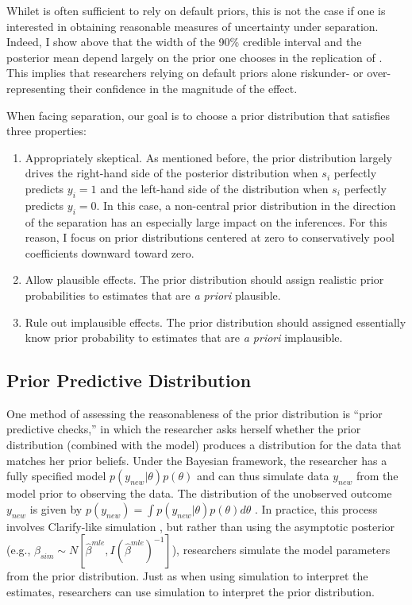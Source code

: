 \documentclass[12pt]{article}
\begin{document}
Whilet is often sufficient to rely on default priors, this is not the case if one is interested in obtaining reasonable measures of uncertainty under separation. Indeed, I show above that the width of the 90\% credible interval and the posterior mean depend largely on the prior one chooses in the replication of \cite{BarrilleauxRainey2014}. This implies that researchers relying on default priors alone riskunder- or over-representing their confidence in the magnitude of the effect.

When facing separation, our goal is to choose a prior distribution that satisfies three properties:
\begin{enumerate}
\item Appropriately skeptical. As mentioned before, the prior distribution largely drives the right-hand side of the posterior distribution when $s_i$ perfectly predicts $y_i = 1$ and the left-hand side of the distribution when $s_i$ perfectly predicts $y_i = 0$. In this case, a non-central prior distribution in the direction of the separation has an especially large impact on the inferences. For this reason, I focus on prior distributions centered at zero to conservatively pool coefficients downward toward zero.
\item Allow plausible effects. The prior distribution should assign realistic prior probabilities to estimates that are \textit{a priori} plausible. 
\item Rule out implausible effects. The prior distribution should assigned essentially know prior probability to estimates that are \textit{a priori} implausible.
\end{enumerate}

\subsection*{Prior Predictive Distribution}

One method of assessing the reasonableness of the prior distribution is ``prior predictive checks,'' in which the researcher asks herself whether the prior distribution (combined with the model) produces a distribution for the data that matches her prior beliefs. Under the Bayesian framework, the researcher has a fully specified model $p(y_{new}|\theta)p(\theta)$ and can thus simulate data $y_{new}$ from the model prior to observing the data. The distribution of the unobserved outcome $y_{new}$ is given by $p(y_{new}) = \int p(y_{new} | \theta)p(\theta) d\theta$ \citep{Box1980}. In practice, this process involves Clarify-like simulation \citep{KingTomzWittenberg2000}, but rather than using the asymptotic posterior (e.g., $\beta_{sim} \sim N\left[\hat{\beta}^{mle}, I(\hat{\beta}^{mle})^{-1}\right]$), researchers simulate the model parameters from the prior distribution. Just as when using simulation to interpret the estimates, researchers can use simulation to interpret the prior distribution.
\end{document}
